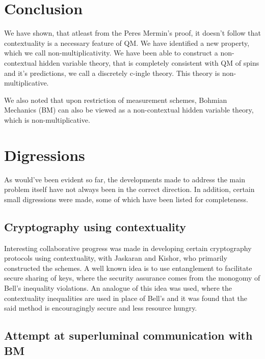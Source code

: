 \section{Conclusion}

We have shown, that atleast from the Peres Mermin's proof, it doesn't
follow that contextuality is a necessary feature of QM. We have identified
a new property, which we call non-multiplicativity. We have been able
to construct a non-contextual hidden variable theory, that is completely
consistent with QM of spins and it's predictions, we call a discretely
c-ingle theory. This theory is non-multiplicative. 

We also noted that upon restriction of measurement schemes, Bohmian
Mechanics (BM) can also be viewed as a non-contextual hidden variable
theory, which is non-multiplicative. 


\section{Digressions}

As would've been evident so far, the developments made to address
the main problem itself have not always been in the correct direction.
In addition, certain small digressions were made, some of which have
been listed for completeness.


\subsection{Cryptography using contextuality}

Interesting collaborative progress was made in developing certain
cryptography protocols using contextuality, with Jaskaran and Kishor,
who primarily constructed the schemes. A well known idea is to use
entanglement to facilitate secure sharing of keys, where the security
assurance comes from the monogomy of Bell's inequality violations.
An analogue of this idea was used, where the contextuality inequalities
are used in place of Bell's and it was found that the said method
is encouragingly secure and less resource hungry. 


\subsection{Attempt at superluminal communication with BM}

